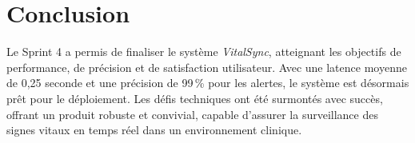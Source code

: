 \section*{Conclusion}
Le Sprint 4 a permis de finaliser le système \textit{VitalSync}, atteignant les objectifs de performance, de précision et de satisfaction utilisateur. Avec une latence moyenne de 0,25 seconde et une précision de 99\,\% pour les alertes, le système est désormais prêt pour le déploiement. Les défis techniques ont été surmontés avec succès, offrant un produit robuste et convivial, capable d’assurer la surveillance des signes vitaux en temps réel dans un environnement clinique.
